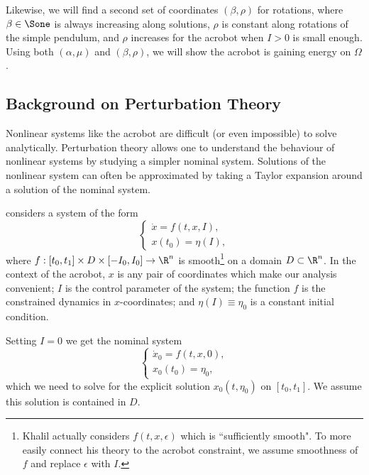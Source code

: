Likewise, we will find a second set of coordinates \((\beta, \rho)\) for
rotations, where \(\beta \in \Sone\) is always increasing along solutions,
\(\rho\) is constant along rotations of the simple pendulum, and \(\rho\)
increases for the acrobot when \(I > 0\) is small enough.
Using both \((\alpha,\mu)\) and \((\beta,\rho)\), we will show the acrobot is
gaining energy on \(\Omega\).

\subsection{Background on Perturbation Theory}
Nonlinear systems like the acrobot are difficult (or even impossible) to solve
analytically.
Perturbation theory allows one to understand the behaviour of nonlinear systems
by studying a simpler nominal system. 
Solutions of the nonlinear system can often be approximated by taking a Taylor
expansion around a solution of the nominal system.

\citet{khalil_nonlinear} considers a system of the form
\begin{equation}\label{eqn:khalil-setup}
    \begin{cases}
        \dot{x} = f(t,x,I), \\
        x(t_0) = \eta(I),
    \end{cases}
\end{equation}
where 
\(f : [t_0,t_1] \times D \times [-I_0,I_0] \rightarrow \R^n\) is  
smooth\footnote{Khalil actually considers \(f(t,x,\epsilon)\) which is ``sufficiently
    smooth". To more easily connect his theory to the acrobot constraint, we
    assume smoothness of \(f\) and replace \(\epsilon\) with \(I\).}
on a domain \(D \subset \R^n\).
In the context of the acrobot, \(x\) is any pair of coordinates which make
our analysis convenient;
\(I\) is the control parameter of the system;
the function \(f\) is the constrained dynamics in \(x\)-coordinates;
and \(\eta(I) \equiv \eta_0\) is a constant initial condition.

Setting \(I = 0\) we get the nominal system
\begin{equation}\label{eqn:khalil-perturbation-nominal}
    \begin{cases}
        \dot{x}_0 = f(t,x,0) ,\\
        x_0(t_0) = \eta_0 ,
    \end{cases}
\end{equation}
which we need to solve for the explicit solution \(x_0(t,\eta_0)\) on
\([t_0,t_1]\).
We assume this solution is contained in \(D\).

